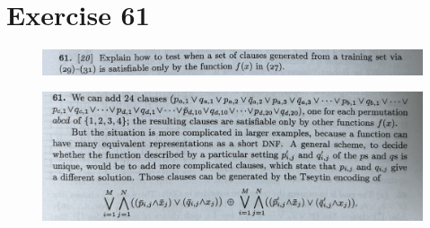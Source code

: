 \documentclass[dvipdfmx,a4paper,12pt]{jsarticle}
\begin{document}
  
\section*{Exercise 61}
 \begin{figure}[htbp]
  \centering
  \includegraphics[width=142mm,angle=0]{images/61.jpg}
  \end{figure}

 \begin{figure}[htbp]
  \centering
  \includegraphics[width=142mm,angle=0]{images/61a.jpg}
  \end{figure}

  
\end{document}
